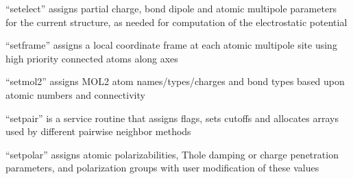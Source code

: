 \documentclass[letterpaper,11pt,english]{sphinxmanual}
\begin{document}
\sphinxAtStartPar
{}

\sphinxAtStartPar
{}

\sphinxAtStartPar
{}

\sphinxAtStartPar
“setelect” assigns partial charge, bond dipole and atomic multipole parameters for the current structure, as needed for computation of the electrostatic potential

\sphinxAtStartPar
{}

\sphinxAtStartPar
{}

\sphinxAtStartPar
{}

\sphinxAtStartPar
{}

\sphinxAtStartPar
“setframe” assigns a local coordinate frame at each atomic multipole site using high priority connected atoms along axes

\sphinxAtStartPar
{}

\sphinxAtStartPar
{}

\sphinxAtStartPar
{}

\sphinxAtStartPar
{}

\sphinxAtStartPar
{}

\sphinxAtStartPar
{}

\sphinxAtStartPar
“setmol2” assigns MOL2 atom names/types/charges and bond types based upon atomic numbers and connectivity

\sphinxAtStartPar
{}

\sphinxAtStartPar
{}

\sphinxAtStartPar
“setpair” is a service routine that assigns flags, sets cutoffs and allocates arrays used by different pairwise neighbor methods

\sphinxAtStartPar
{}

\sphinxAtStartPar
“setpolar” assigns atomic polarizabilities, Thole damping or charge penetration parameters, and polarization groups with user modification of these values

\sphinxAtStartPar
{}
\end{document}
